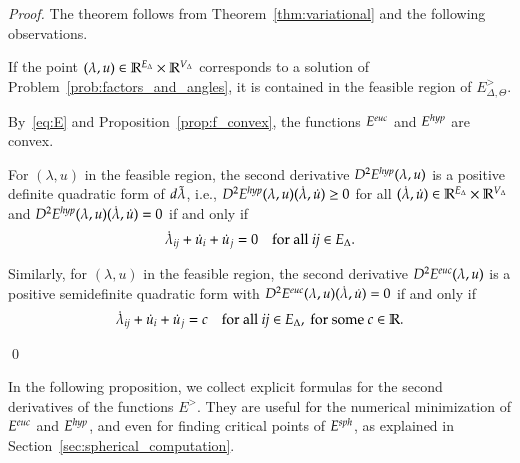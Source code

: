 \documentclass[Thesis]{subfiles}
\begin{document}
\begin{proof}
  The theorem follows from Theorem~\ref{thm:variational} and the
  following observations.
  
  \begin{compactenum}[(1)]
  \item If the point $(\lambda,
    u)\in\mathbb R^{E_{\Delta}}\times\mathbb R^{V_{\Delta}}$ corresponds to a
    solution of Problem~\ref{prob:factors_and_angles}, it is contained
    in the feasible region of $E^{\gt}_{\Delta,\Theta}$.


  \item By~\eqref{eq:E} and Proposition~\ref{prop:f_convex}, the
    functions $E^{\euc}$ and $E^{\mathit{hyp}}$ are convex.

  \item For $(\lambda, u)$ in the feasible region, the second
    derivative $D^{2}E^{\mathit{hyp}}(\lambda,u)$ is a positive definite
    quadratic form of $d\tilde{\lambda}$, i.e.,
    $D^{2}E^{\mathit{hyp}}(\lambda,u)(\dot\lambda,\dot u)\geq 0$ for all
    $(\dot\lambda,\dot u)\in\mathbb R^{E_{\Delta}}\times\mathbb R^{V_{\Delta}}$ and
    $D^{2}E^{\mathit{hyp}}(\lambda,u)(\dot\lambda,\dot u)=0$ if and only if
    \begin{equation*}
      \dot\lambda_{\it ij}+\dot u_{i}+\dot u_{j}=0
      \quad\text{for all }{\it ij}\in E_{\Delta}.
    \end{equation*}
    
  \item Similarly, for $(\lambda, u)$ in the feasible region, the
    second derivative $D^{2}E^{\euc}(\lambda,u)$ is a positive
    semidefinite quadratic form with
    $D^{2}E^{\euc}(\lambda,u)(\dot\lambda,\dot u)=0$ if and only if
    \begin{equation*}
      \dot\lambda_{\it ij}+\dot u_{i}+\dot u_{j}=c
      \quad\text{for all }{\it ij}\in E_{\Delta},
      \text{ for some } c\in\mathbb R.
    \end{equation*}
  \end{compactenum}
  \qed
\end{proof}

In the following proposition, we collect explicit formulas for the
second derivatives of the functions $E^{\gt}$. They are useful for the
numerical minimization of $E^{\euc}$ and $E^{\mathit{hyp}}$, and even for
finding critical points of $E^{\mathit{sph}}$, as explained in
Section~\ref{sec:spherical_computation}.
\end{document}
